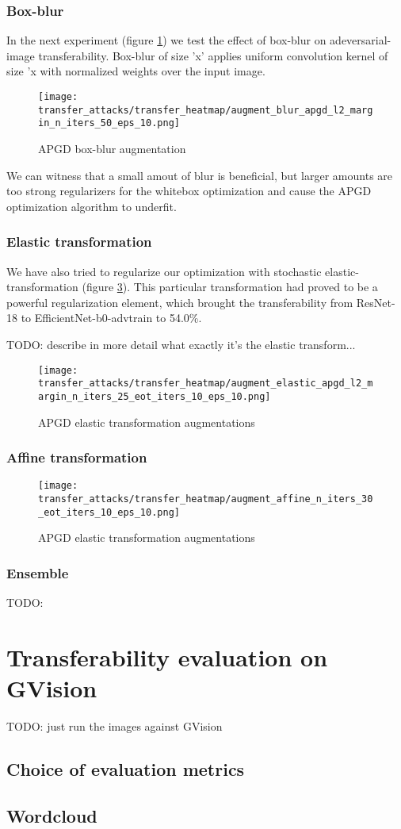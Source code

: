 \subsubsection{Box-blur}
In the next experiment (figure \ref{fig:apgd_box_blur}) we test the effect of box-blur on adeversarial-image transferability. Box-blur of size 'x' applies uniform convolution kernel of size 'x with normalized weights over the input image. 

\begin{figure}
    \centering
    \texttt{[image: transfer\_attacks/transfer\_heatmap/augment\_blur\_apgd\_l2\_margin\_n\_iters\_50\_eps\_10.png]}
    \caption{APGD box-blur augmentation}
    \label{fig:apgd_box_blur}
\end{figure}

We can witness that a small amout of blur is beneficial, but larger amounts are too strong regularizers for the whitebox optimization and cause the APGD optimization algorithm to underfit.

\subsubsection{Elastic transformation}
We have also tried to regularize our optimization with stochastic elastic-transformation (figure \ref{fig:apgd_elastic}). This particular transformation had proved to be a powerful regularization element, which brought the transferability from ResNet-18 to EfficientNet-b0-advtrain to 54.0\%.


TODO: describe in more detail what exactly it's the elastic transform...
\begin{figure}
    \centering
    \texttt{[image: transfer\_attacks/transfer\_heatmap/augment\_elastic\_apgd\_l2\_margin\_n\_iters\_25\_eot\_iters\_10\_eps\_10.png]}
    \caption{APGD elastic transformation augmentations}
    \label{fig:apgd_elastic}
\end{figure}

\subsubsection{Affine transformation}

\begin{figure}
    \centering
    \texttt{[image: transfer\_attacks/transfer\_heatmap/augment\_affine\_n\_iters\_30\_eot\_iters\_10\_eps\_10.png]}
    \caption{APGD elastic transformation augmentations}
    \label{fig:apgd_elastic}
\end{figure}


\subsubsection{Ensemble}
TODO:


\section{Transferability evaluation on GVision}
TODO: just run the images against GVision

\subsection{Choice of evaluation metrics}

\subsection{Wordcloud}